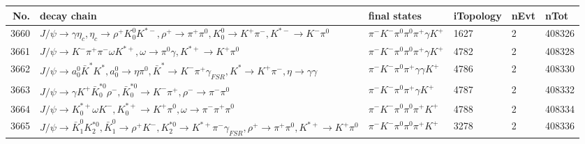 \begin{table}[htbp] 
\begin{center}
\begin{small}
\begin{tabular}{rlllll}\hline\hline
 No. & decay chain & final states &  iTopology & nEvt & nTot \\\hline
3660&$J/\psi       \rightarrow \gamma       \eta_{c}    , \eta_{c}     \rightarrow \rho^{+}      K_0^{0}        K^{*-}         , \rho^{+}       \rightarrow \pi^{+}        \pi^{0}        , K_0^{0}         \rightarrow K^{+}          \pi^{-}        , K^{*-}          \rightarrow K^{-}          \pi^{0}        $&$\pi^{-}        K^{-}          \pi^{0}        \pi^{0}        \pi^{+}        \gamma       K^{+}          $& 1627&    2&408326\\
3661&$J/\psi       \rightarrow K^{-}          \pi^{+}        \pi^{-}        \omega         K^{*+}         , \omega          \rightarrow \pi^{0}        \gamma       , K^{*+}          \rightarrow K^{+}          \pi^{0}        $&$\pi^{-}        K^{-}          \pi^{0}        \pi^{0}        \pi^{+}        \gamma       K^{+}          $& 4782&    2&408328\\
3662&$J/\psi       \rightarrow a_{0}^{0}      \bar{K}^{*}   K^{*}          , a_{0}^{0}       \rightarrow \eta          \pi^{0}        , \bar{K}^{*}    \rightarrow K^{-}          \pi^{+}        \gamma_{FSR} , K^{*}           \rightarrow K^{+}          \pi^{-}        , \eta           \rightarrow \gamma       \gamma       $&$\pi^{-}        K^{-}          \pi^{0}        \pi^{+}        \gamma       \gamma       K^{+}          $& 4786&    2&408330\\
3663&$J/\psi       \rightarrow \gamma       K^{+}          \bar{K}_0^{*0}\rho^{-}      , \bar{K}_0^{*0} \rightarrow K^{-}          \pi^{+}        , \rho^{-}       \rightarrow \pi^{-}        \pi^{0}        $&$\pi^{-}        K^{-}          \pi^{0}        \pi^{+}        \gamma       K^{+}          $& 4787&    2&408332\\
3664&$J/\psi       \rightarrow K_{0}^{*+}     \omega         K^{-}          , K_{0}^{*+}      \rightarrow K^{+}          \pi^{0}        , \omega          \rightarrow \pi^{-}        \pi^{+}        \pi^{0}        $&$\pi^{-}        K^{-}          \pi^{0}        \pi^{0}        \pi^{+}        K^{+}          $& 4788&    2&408334\\
3665&$J/\psi       \rightarrow \bar{K}_1^{0} K_2^{*0}       , \bar{K}_1^{0}  \rightarrow \rho^{+}      K^{-}          , K_2^{*0}        \rightarrow K^{*+}         \pi^{-}        \gamma_{FSR} , \rho^{+}       \rightarrow \pi^{+}        \pi^{0}        , K^{*+}          \rightarrow K^{+}          \pi^{0}        $&$\pi^{-}        K^{-}          \pi^{0}        \pi^{0}        \pi^{+}        K^{+}          $& 3278&    2&408336\\

\end{tabular}
\end{small}
\end{center}
\end{table}
